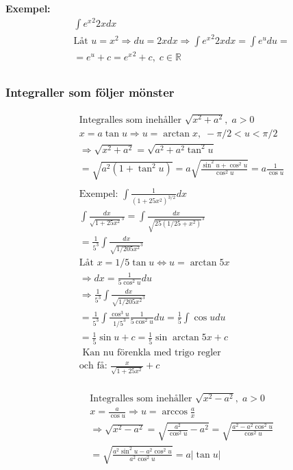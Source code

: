 \begin{multicols}{2}
\textbf{Exempel: }
\begin{align*}
  &\int {e^x}^2 2x dx  \\
  &\text{Låt } u=x^2 \Rightarrow du=2x dx \Rightarrow \int {e^x}^2 2x dx=\int e^u du = \\
  &= e^u+c={e^x}^2+c, \; c\in\mathbb{R} \\
\end{align*}


\subsubsection{Integraller som följer mönster}

\begin{align*}
  &\text{Integralles som inehåller } \sqrt{x^2+a^2}, \; a > 0  \\ 
  &x=a\tan{u} \Rightarrow u=\arctan{x}, \; -\pi/2<u<\pi/2  \\
  &\Rightarrow \sqrt{x^2+ a^2}=\sqrt{a^2+a^2\tan^2{u}} \\
  &=\sqrt{a^2(1+\tan^2{u})} = a\sqrt{\frac{\sin^2{u}+\cos^2{u}}{\cos^2{u}}} = a \frac{1}{\cos{u}} \\
  &\\
  &\text{Exempel: } \int \frac{1}{{(1+25x^2)}^{3/2}}dx \\
  &\int \frac{dx}{\sqrt{1+25x^2}^3}=\int \frac{dx}{\sqrt{25(1/25+x^2)}^3} \\
  &=\frac{1}{5^3} \int \frac{dx}{\sqrt{1/205x^2}^3} \\
  &\text{Låt } x=1/5\tan{u} \Leftrightarrow u=\arctan{5x} \\
  &\Rightarrow dx=\frac{1}{5\cos^2{u}}du \\
  &\Rightarrow \frac{1}{5^3} \int \frac{dx}{\sqrt{1/205x^2}^3} \\
  &=\frac{1}{5^3}\int\frac{\cos^3{u}}{{1/5}^3}\frac{1}{5\cos^2{u}}du=\frac{1}{5}\int\cos{u}du \\
  &=\frac{1}{5}\sin{u}+c = \frac{1}{5}\sin{\arctan{5x}}+c \\
  &\text{ Kan nu förenkla med trigo regler} \\
  &\text{och få: } \frac{x}{\sqrt{1+25x^2}}+c \\
\end{align*}

\begin{align*}
  &\text{Integralles som inehåller } \sqrt{x^2-a^2}, \; a > 0  \\ 
  &x=\frac{a}{\cos{u}} \Rightarrow u=\arccos{\frac{a}{x}} \\
  &\Rightarrow \sqrt{x^2-a^2}=\sqrt{\frac{a^2}{\cos^2{u}}-a^2}=\sqrt{\frac{a^2-a^2\cos^2{u}}{\cos^2{u}}} \\
  &=\sqrt{\frac{a^2\sin^2{u}-a^2\cos^2{u}}{a^2\cos^2{u}}} = a|\tan{u}| \\
\end{align*}


\end{multicols}
